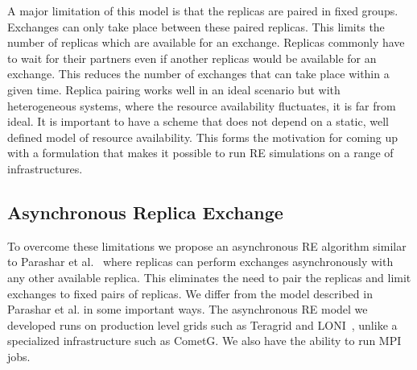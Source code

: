 \documentclass[a4paper,10pt]{article}
\newcommand{\jhanote}[1]{ {\textcolor{red} { ***shantenu: #1 }}}
\newcommand{\athotanote}[1]{ {\textcolor{green} { ***athota: #1 }}}
\newcommand{\jhanote}[1]{}
\newcommand{\athotanote}[1]{}
\begin{document}
A major limitation of this model is that the replicas are paired in fixed groups. 
Exchanges can only take place between these paired replicas.
This limits the number of replicas which are available for an exchange. 
Replicas commonly have to wait for their partners even if another replicas 
would be available for an exchange. %
This reduces the number of exchanges that can take place within a given time.
Replica pairing works well in an ideal scenario but with heterogeneous systems, 
where the resource availability fluctuates, it is far from ideal. It is 
important to have a scheme that does not depend on a static, well defined 
model of resource availability. This forms the motivation for coming up 
with a formulation that makes it possible to run RE simulations on a range of infrastructures.

  

  
\subsection{Asynchronous Replica Exchange}

To overcome these limitations we propose an asynchronous RE algorithm similar to Parashar et al.~\cite{parashar_arepex}
where replicas can perform exchanges asynchronously with any other available replica. This eliminates the need to pair the replicas and limit exchanges to fixed pairs of replicas. We differ from the model described in Parashar et al. in some important ways. The asynchronous RE model we developed runs on production level grids such as Teragrid and LONI~\cite{LONI_web}, unlike a specialized infrastructure such as CometG. We also have the ability to run MPI jobs.
\end{document}
